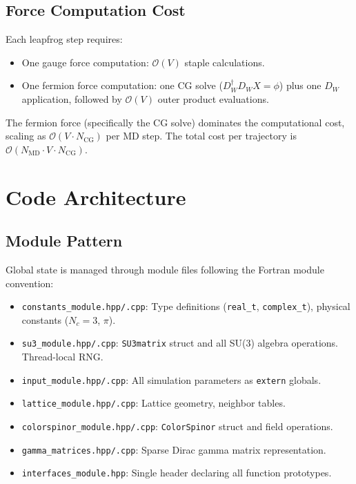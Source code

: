 \documentclass[12pt]{article}
\newcommand{\code}[1]{\texttt{#1}}
\begin{document}
\subsection{Force Computation Cost}

Each leapfrog step requires:
\begin{itemize}
\item One gauge force computation: $\mathcal{O}(V)$ staple calculations.
\item One fermion force computation: one CG solve ($D_W^\dagger D_W X = \phi$) plus one $D_W$ application, followed by $\mathcal{O}(V)$ outer product evaluations.
\end{itemize}
The fermion force (specifically the CG solve) dominates the computational cost, scaling as $\mathcal{O}(V \cdot N_{\mathrm{CG}})$ per MD step. The total cost per trajectory is $\mathcal{O}(N_{\mathrm{MD}} \cdot V \cdot N_{\mathrm{CG}})$.


\section{Code Architecture}
\label{sec:architecture}

\subsection{Module Pattern}

Global state is managed through module files following the Fortran module convention:
\begin{itemize}
\item \code{constants\_module.hpp/.cpp}: Type definitions (\code{real\_t}, \code{complex\_t}), physical constants ($N_c = 3$, $\pi$).
\item \code{su3\_module.hpp/.cpp}: \code{SU3matrix} struct and all SU(3) algebra operations. Thread-local RNG.
\item \code{input\_module.hpp/.cpp}: All simulation parameters as \code{extern} globals.
\item \code{lattice\_module.hpp/.cpp}: Lattice geometry, neighbor tables.
\item \code{colorspinor\_module.hpp/.cpp}: \code{ColorSpinor} struct and field operations.
\item \code{gamma\_matrices.hpp/.cpp}: Sparse Dirac gamma matrix representation.
\item \code{interfaces\_module.hpp}: Single header declaring all function prototypes.
\end{itemize}
\end{document}
